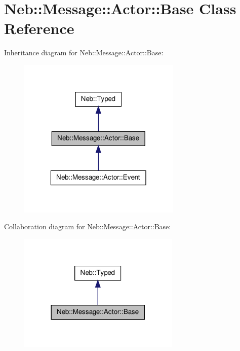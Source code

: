 \hypertarget{classNeb_1_1Message_1_1Actor_1_1Base}{\section{\-Neb\-:\-:\-Message\-:\-:\-Actor\-:\-:\-Base \-Class \-Reference}
\label{classNeb_1_1Message_1_1Actor_1_1Base}
}


\-Inheritance diagram for \-Neb\-:\-:\-Message\-:\-:\-Actor\-:\-:\-Base\-:\nopagebreak
\begin{figure}[H]
\begin{center}
\leavevmode
\includegraphics[width=220pt]{classNeb_1_1Message_1_1Actor_1_1Base__inherit__graph}
\end{center}
\end{figure}


\-Collaboration diagram for \-Neb\-:\-:\-Message\-:\-:\-Actor\-:\-:\-Base\-:\nopagebreak
\begin{figure}[H]
\begin{center}
\leavevmode
\includegraphics[width=218pt]{classNeb_1_1Message_1_1Actor_1_1Base__coll__graph}
\end{center}
\end{figure}
